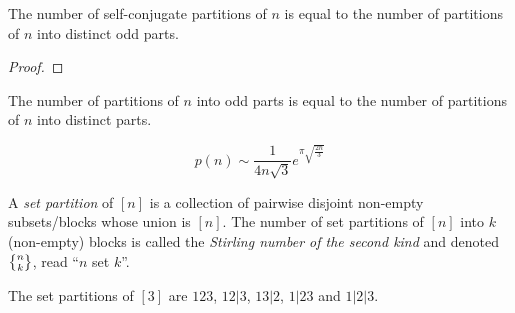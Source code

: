 \begin{theorem}
    The number of self-conjugate partitions of $n$ is equal to the number
    of partitions of $n$ into distinct odd parts.
\end{theorem}
\begin{proof}
\end{proof}

\begin{theorem}[Euler] \label{thm:partitions:euler}
    The number of partitions of $n$ into odd parts is equal to the number
    of partitions of $n$ into distinct parts.
\end{theorem}

\begin{fact} \label{thm:partitions:ramanujan}
    \[
        p(n) \sim \frac{1}{4n\sqrt{3}} e^{\pi \sqrt{\frac{2n}{3}}}
    \]
\end{fact}

\begin{definition} \label{def:set_partitions}
    A \emph{set partition} of $[n]$ is a collection of pairwise disjoint
    non-empty subsets/blocks whose union is $[n]$.
    The number of set partitions of $[n]$ into $k$ (non-empty) blocks is
    called the \emph{Stirling number of the second kind} and denoted
    $\stirling{n}{k}$, read ``$n$ set $k$''.
\end{definition}
\begin{example}
    The set partitions of $[3]$ are $123$, $12|3$, $13|2$, $1|23$ and
    $1|2|3$.
\end{example}
